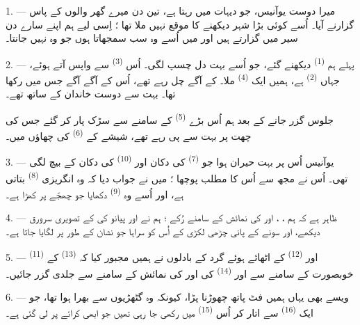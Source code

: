 \VUsaut{4.0mm}
\VUsaut{3.0mm}

\VUsaut{3.0mm}

1. --- میرا دوست یوآنیس، جو دیہات میں رہتا ہے، تین دن میرے گھر والوں
کے پاس گزارنے آیا۔  اُسے کوئی بڑا شہر دیکھنے کا
موقع نہیں ملا تھا ؛ اِسی لیے ہم اپنے سارے دن سیر میں گزارتے ہیں اور
میں اُسے وہ سب سمجھاتا ہوں جو وہ نہیں جانتا۔

2. --- پہلے ہم  \textsuperscript{(1)} دیکھنے گئے، جو
اُسے بہت دل چسپ لگی۔ اُس  \textsuperscript{(3)} سے واپس
آتے ہوئے، جہاں  \textsuperscript{(2)} ہے، ہمیں ایک
 \textsuperscript{(4)} ملا۔  کے
آگے  چل رہے تھے، اُس  کے آگے آگے
جس میں  رکھا تھا۔ بہت سے دوست  خاندان کے
ساتھ تھے۔

جلوس گزر جانے کے بعد ہم اُس بڑے  \textsuperscript{(5)}
کے سامنے سے سڑک پار کر گئے جس کی چھت پر بہت سے 
 پی رہے تھے، شیشے کے 
\textsuperscript{(6)} کی چھاؤں میں۔

3. --- یوآنیس اُس  پر بہت حیران ہوا جو  \textsuperscript{(7)} کی دکان اور 
\textsuperscript{(10)} کی دکان کے بیچ لگی تھی۔ اُس نے مجھ سے اُس کا
مطلب پوچھا ؛ میں نے جواب دیا کہ وہ انگریزی 
\textsuperscript{(8)} بتاتی ہے، اور اُسے وہ 
\textsuperscript{(9)} دکھایا جو چھجّے پر کھڑا ہے۔

\VUsaut{3.0mm}

4. --- ظاہر ہے کہ ہم ، ،
 اور  کی نمائش کے سامنے رُکے ؛ ہم نے
 اور پیانو کی  کے تصویری سرورق دیکھے،
اور سونے کے پانی چڑھی لکڑی کے اُس  کو سراہا جو نشان کے
طور پر لگایا جاتا ہے۔

5. ---  \textsuperscript{(11)} اور
 \textsuperscript{(12)} کے اٹھائے ہوئے گرد کے
بادلوں نے ہمیں مجبور کیا کہ 
\textsuperscript{(13)} کے خوبصورت  کے سامنے سے اور
 \textsuperscript{(14)} کی  اور
 کی نمائش کے سامنے سے جلدی گزر جائیں۔

6. --- ویسے بھی یہاں ہمیں فٹ پاتھ چھوڑنا پڑا، کیونکہ وہ گٹھڑیوں سے
بھرا ہوا تھا، جو ایک  \textsuperscript{(16)} سے
اتار کر اُس  \textsuperscript{(15)} میں رکھی جا رہی تھیں
جو ابھی کرائے پر لی گئی ہے۔

